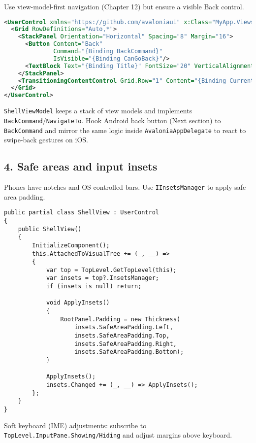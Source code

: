 Use view-model-first navigation (Chapter 12) but ensure a visible Back
control.

\begin{lstlisting}[language=XML]
<UserControl xmlns="https://github.com/avaloniaui" x:Class="MyApp.Views.ShellView">
  <Grid RowDefinitions="Auto,*">
    <StackPanel Orientation="Horizontal" Spacing="8" Margin="16">
      <Button Content="Back"
              Command="{Binding BackCommand}"
              IsVisible="{Binding CanGoBack}"/>
      <TextBlock Text="{Binding Title}" FontSize="20" VerticalAlignment="Center"/>
    </StackPanel>
    <TransitioningContentControl Grid.Row="1" Content="{Binding Current}"/>
  </Grid>
</UserControl>
\end{lstlisting}

\passthrough{\lstinline!ShellViewModel!} keeps a stack of view models
and implements
\passthrough{\lstinline!BackCommand!}/\passthrough{\lstinline!NavigateTo!}.
Hook Android back button (Next section) to
\passthrough{\lstinline!BackCommand!} and mirror the same logic inside
\passthrough{\lstinline!AvaloniaAppDelegate!} to react to swipe-back
gestures on iOS.

\subsection{4. Safe areas and input
insets}\label{safe-areas-and-input-insets}

Phones have notches and OS-controlled bars. Use
\passthrough{\lstinline!IInsetsManager!} to apply safe-area padding.

\begin{lstlisting}
public partial class ShellView : UserControl
{
    public ShellView()
    {
        InitializeComponent();
        this.AttachedToVisualTree += (_, __) =>
        {
            var top = TopLevel.GetTopLevel(this);
            var insets = top?.InsetsManager;
            if (insets is null) return;

            void ApplyInsets()
            {
                RootPanel.Padding = new Thickness(
                    insets.SafeAreaPadding.Left,
                    insets.SafeAreaPadding.Top,
                    insets.SafeAreaPadding.Right,
                    insets.SafeAreaPadding.Bottom);
            }

            ApplyInsets();
            insets.Changed += (_, __) => ApplyInsets();
        };
    }
}
\end{lstlisting}

Soft keyboard (IME) adjustments: subscribe to
\passthrough{\lstinline!TopLevel.InputPane.Showing/Hiding!} and adjust
margins above keyboard.

